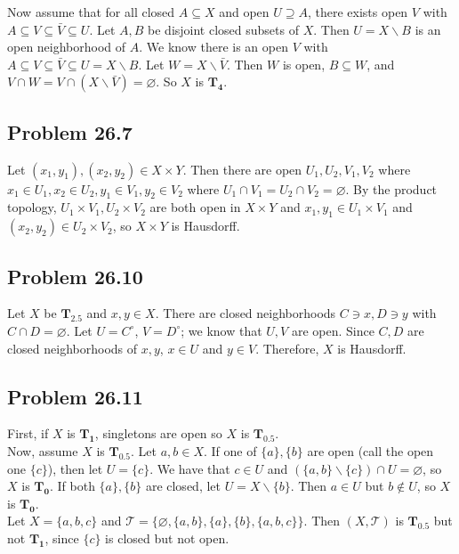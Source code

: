 \documentclass{article}
\newcommand{\T}{\mathcal{T}}
\newcommand{\nullset}{\varnothing}
\newcommand{\minus}{\backslash}
\begin{document}
Now assume that for all closed $A \subseteq X$ and open $U \supseteq A$, there exists open $V$ with $A \subseteq V \subseteq \bar{V} \subseteq U$. Let $A, B$ be disjoint closed subsets of $X$. Then $U = X \minus B$ is an open neighborhood of $A$. We know there is an open $V$ with $A \subseteq V \subseteq \bar{V} \subseteq U = X \minus B$. Let $W = X \minus \bar{V}$. Then $W$ is open, $B \subseteq W$, and $V \cap W = V \cap (X \minus \bar{V}) = \nullset$. So $X$ is $\mathbf{T_4}$.

\subsection*{Problem 26.7}
Let $(x_1, y_1), (x_2, y_2) \in X\times Y$. Then there are open $U_1, U_2, V_1, V_2$ where $x_1 \in U_1, x_2 \in U_2, y_1 \in V_1, y_2 \in V_2$ where $U_1 \cap V_1 = U_2 \cap V_2 = \nullset$. By the product topology, $U_1 \times V_1, U_2 \times V_2$ are both open in $X \times Y$ and $x_1, y_1 \in U_1 \times V_1$ and $(x_2, y_2) \in U_2 \times V_2$, so $X\times Y$ is Hausdorff.

\subsection*{Problem 26.10}
Let $X$ be $\mathbf{T_{2.5}}$ and $x, y \in X$. There are closed neighborhoods $C \ni x, D \ni y$ with $C \cap D = \nullset$. Let $U = C^\circ$, $V = D^\circ$; we know that $U, V$ are open. Since $C, D$ are closed neighborhoods of $x, y$, $x \in U$ and $y \in V$. Therefore, $X$ is Hausdorff.

\subsection*{Problem 26.11}
First, if $X$ is $\mathbf{T_1}$, singletons are open so $X$ is $\mathbf{T_{0.5}}$. \\

Now, assume $X$ is $\mathbf{T_{0.5}}$. Let $a, b \in X$. If one of $\{a\}, \{b\}$ are open (call the open one $\{c\}$), then let $U = \{c\}$. We have that $c \in U$ and $(\{a, b\} \minus \{c\}) \cap U = \nullset$, so $X$ is $\mathbf{T_0}$. If both $\{a\}, \{b\}$ are closed, let $U = X \minus \{b\}$. Then $a \in U$ but $b \not\in U$, so $X$ is $\mathbf{T_0}$. \\

Let $X = \{a, b, c\}$ and $\T = \{\nullset, \{a, b\}, \{a\}, \{b\}, \{a, b, c\}\}$. Then $(X, \T)$ is $\mathbf{T_{0.5}}$ but not $\mathbf{T_{1}}$, since $\{c\}$ is closed but not open.
\end{document}
